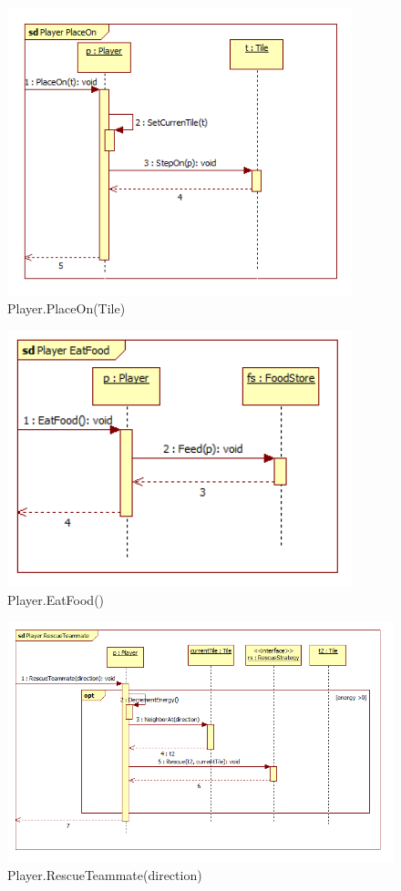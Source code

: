 \begin{figure}[H]
	\begin{center}
		\includegraphics[width=10cm]{chapters/chapter03/seqdiag/Player_PlaceOn.png}
		\caption{Player.PlaceOn(Tile)}
		\label{fig:PlayerPlaceOn}
	\end{center}
\end{figure}
\begin{figure}[H]
	\begin{center}
		\includegraphics[width=10cm]{chapters/chapter03/seqdiag/Player_EatFood.png}
		\caption{Player.EatFood()}
		\label{fig:PlayerEatFood}
	\end{center}
\end{figure}
\begin{figure}[H]
	\begin{center}
		\includegraphics[width=15cm]{chapters/chapter03/seqdiag/Player_RescueTeammate.png}
		\caption{Player.RescueTeammate(direction)}
		\label{fig:Player.RescueTeammate}
	\end{center}
\end{figure}
